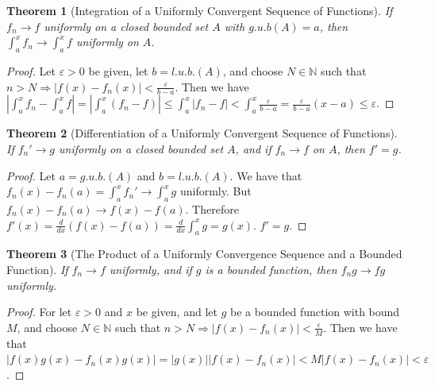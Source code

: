 \documentclass[oneside]{book}
\theoremstyle{mystyle}
\newtheorem{theorem}{Theorem}[section]
\begin{document}
\begin{theorem}[Integration of a Uniformly Convergent Sequence of Functions] If $f_n\rightarrow f$ uniformly on a closed bounded set $A$ with $g.u.b(A)=a$, then $\int_{a}^{x} f_n \rightarrow \int_{a}^{x} f$ uniformly on $A$.
\end{theorem}
\begin{proof}
Let $\varepsilon >0$ be given, let $b=l.u.b.(A)$, and choose $N\in\mathbb{N}$ such that $n>N\Rightarrow |f(x)-f_n(x)|<\frac{\varepsilon}{b-a}$. Then we have $|\int_{a}^{x} f_n - \int_{a}^{x} f| = |\int_{a}^{x} (f_n-f)| \leq \int_{a}^{x} |f_n-f| < \int_{a}^{x} \frac{\varepsilon}{b-a}= \frac{\varepsilon}{b-a}(x-a) \leq \varepsilon$. 
\end{proof}

\begin{theorem}[Differentiation of a Uniformly Convergent Sequence of Functions]
If $f_n'\rightarrow g$ uniformly on a closed bounded set $A$, and if $f_n \rightarrow f$ on $A$, then $f' = g$.
\end{theorem}
\begin{proof} Let $a=g.u.b.(A)$ and $b=l.u.b.(A)$. We have that $f_n(x) - f_n(a) = \int_{a}^{x}f_n' \rightarrow \int_{a}^{x}g$ uniformly. But $f_n(x)-f_n(a) \rightarrow f(x) - f(a)$. Therefore $f'(x)=\frac{d}{dx}(f(x)-f(a)) = \frac{d}{dx}\int_{a}^{x} g = g(x)$. $f' = g$.
\end{proof}

\begin{theorem}[The Product of a Uniformly Convergence Sequence and a Bounded Function]  If $f_n \rightarrow f$ uniformly, and if $g$ is a bounded function, then $f_n g \rightarrow fg$ uniformly.
\end{theorem}
\begin{proof}
For let $\varepsilon>0$ and $x$ be given, and let $g$ be a bounded function with bound $M$, and choose $N\in\mathbb{N}$ such that $n>N \Rightarrow |f(x)-f_n(x)|<\frac{\varepsilon}{M}$. Then we have that $|f(x)g(x)-f_n(x)g(x)| = |g(x)||f(x)-f_n(x)| < M|f(x)-f_n(x)| <\varepsilon$.
\end{proof}
\end{document}
